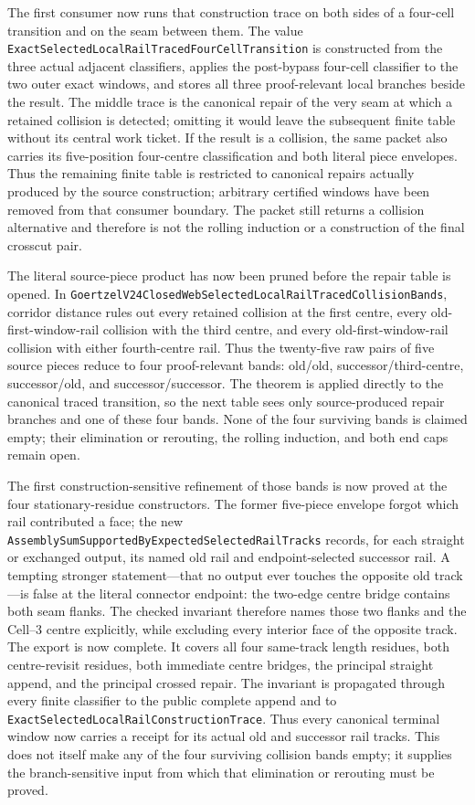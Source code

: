 \documentclass[11pt]{article}
\theoremstyle{definition}
\begin{document}
The first consumer now runs that construction trace on both sides of a
four-cell transition and on the seam between them.  The value
\texttt{ExactSelectedLocalRailTracedFourCellTransition} is constructed from
the three actual adjacent classifiers, applies the post-bypass four-cell
classifier to the two outer exact windows, and stores all three
proof-relevant local branches beside the result.  The middle trace is the
canonical repair of the very seam at which a retained collision is detected;
omitting it would leave the subsequent finite table without its central work
ticket.  If the result is a collision, the same packet
also carries its five-position four-centre classification and both literal
piece envelopes.  Thus the remaining finite table is restricted to canonical
repairs actually produced by the source construction; arbitrary certified
windows have been removed from that consumer boundary.  The packet still
returns a collision alternative and therefore is not the rolling induction or
a construction of the final crosscut pair.

The literal source-piece product has now been pruned before the repair table
is opened.  In
\texttt{GoertzelV24ClosedWebSelectedLocalRailTracedCollisionBands}, corridor
distance rules out every retained collision at the first centre, every
old-first-window-rail collision with the third centre, and every
old-first-window-rail collision with either fourth-centre rail.  Thus the
twenty-five raw pairs of five source pieces reduce to four proof-relevant
bands: old/old, successor/third-centre, successor/old, and
successor/successor.  The theorem is applied directly to the canonical traced
transition, so the next table sees only source-produced repair branches and
one of these four bands.  None of the four surviving bands is claimed empty;
their elimination or rerouting, the rolling induction, and both end caps
remain open.

The first construction-sensitive refinement of those bands is now proved at
the four stationary-residue constructors.  The former five-piece envelope
forgot which rail contributed a face; the new
\texttt{AssemblySumSupportedByExpectedSelectedRailTracks} records, for each
straight or exchanged output, its named old rail and endpoint-selected
successor rail.  A tempting stronger statement---that no output ever touches
the opposite old track---is false at the literal connector endpoint: the
two-edge centre bridge contains both seam flanks.  The checked invariant
therefore names those two flanks and the Cell--3 centre explicitly, while
excluding every interior face of the opposite track.  The export is now
complete.  It covers all four same-track length residues, both centre-revisit
residues, both immediate centre bridges, the principal straight append, and
the principal crossed repair.  The invariant is propagated through every
finite classifier to the public complete append and to
\texttt{ExactSelectedLocalRailConstructionTrace}.  Thus every canonical
terminal window now carries a receipt for its actual old and successor rail
tracks.  This does not itself make any of the four surviving collision bands
empty; it supplies the branch-sensitive input from which that elimination or
rerouting must be proved.
\end{document}
